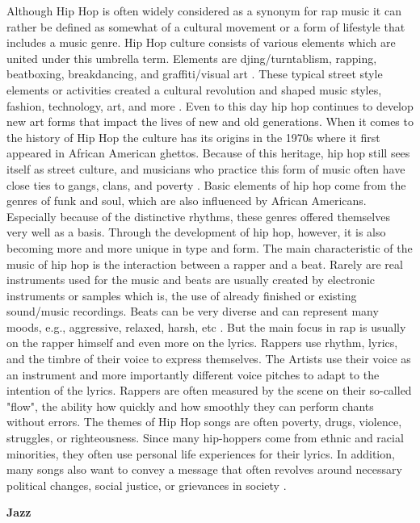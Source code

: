 Although Hip Hop is often widely considered as a synonym for rap music it can rather be defined as somewhat
of a cultural movement or a form of lifestyle that includes a music genre.
Hip Hop culture consists of various elements which are united under this umbrella term.
Elements are djing/turntablism, rapping, beatboxing, breakdancing, and graffiti/visual art \cite{MusicalDictHipHop}.
These typical street style elements or activities created a cultural revolution and shaped music styles,
fashion, technology, art, and more \cite{TateHipHop}.
Even to this day hip hop continues to develop new art forms that impact the lives of new and old generations.
When it comes to the history of Hip Hop the culture has its origins in the 1970s where it first appeared
in African American ghettos.
Because of this heritage, hip hop still sees itself as street culture, and musicians who practice
this form of music often have close ties to gangs, clans, and poverty \cite{Rory2019}.
Basic elements of hip hop come from the genres of funk and soul, which are also influenced by
African Americans.
Especially because of the distinctive rhythms, these genres offered themselves very well as a basis.
Through the development of hip hop, however, it is also becoming more and more unique in type and form.
The main characteristic of the music of hip hop is the interaction between a rapper and a beat.
Rarely are real instruments used for the music and beats are usually created by electronic
instruments or samples which is, the use of already finished or existing sound/music recordings.
Beats can be very diverse and can represent many moods, e.g., aggressive, relaxed, harsh, etc \cite{MusicalDictHipHop}.
But the main focus in rap is usually on the rapper himself and even more on the lyrics.
Rappers use rhythm, lyrics, and the timbre of their voice to express themselves.
The Artists use their voice as an instrument and more importantly different voice pitches
to adapt to the intention of the lyrics.
Rappers are often measured by the scene on their so-called "flow",
the ability how quickly and how smoothly they can perform chants without errors.
The themes of Hip Hop songs are often poverty, drugs, violence, struggles, or righteousness.
Since many hip-hoppers come from ethnic and racial minorities, they often use personal life
experiences for their lyrics.
In addition, many songs also want to convey a message that often revolves around necessary
political changes, social justice, or grievances in society \cite{Goodrich2017}.

\textbf{Jazz}

